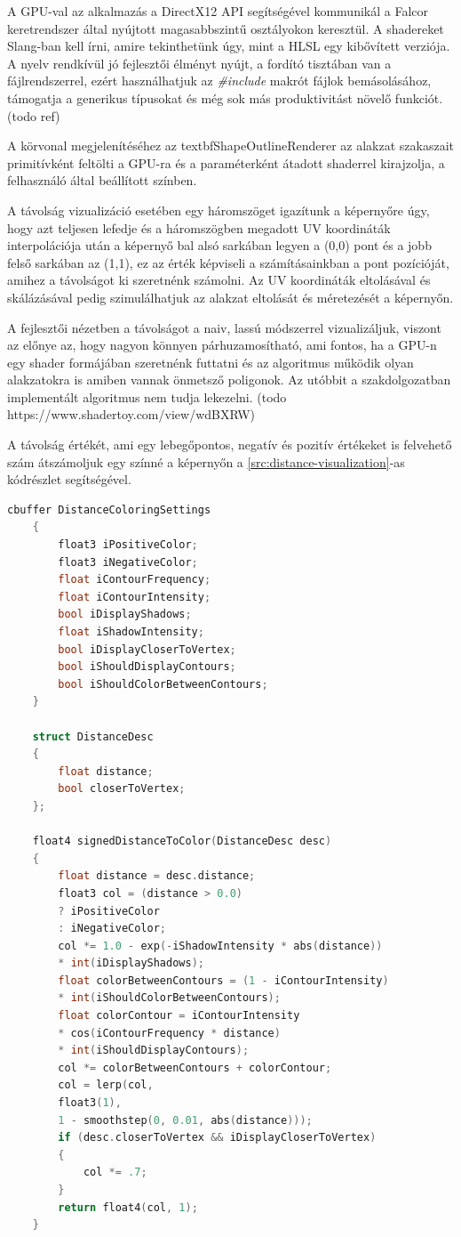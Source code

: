 A GPU-val az alkalmazás a DirectX12 API segítségével kommunikál a Falcor keretrendszer által nyújtott magasabbszintű osztályokon keresztül. A shadereket Slang-ban kell írni, amire tekinthetünk úgy, mint a HLSL egy kibővített verziója. A nyelv rendkívül jó fejlesztői élményt nyújt, a fordító tisztában van a fájlrendszerrel, ezért használhatjuk az \textit{\#include} makrót fájlok bemásolásához, támogatja a generikus típusokat és még sok más produktivitást növelő funkciót. (todo ref)

A körvonal megjelenítéséhez az textbf{ShapeOutlineRenderer} az alakzat szakaszait primitívként feltölti a GPU-ra és a paraméterként átadott shaderrel kirajzolja, a felhasználó által beállított színben.

A távolság vizualizáció esetében egy háromszöget igazítunk a képernyőre úgy, hogy azt teljesen lefedje és a háromszögben megadott UV koordináták interpolációja után a képernyő bal alsó sarkában legyen a (0,0) pont és a jobb felső sarkában az (1,1), ez az érték képviseli a számításainkban a pont pozícióját, amihez a távolságot ki szeretnénk számolni. Az UV koordináták eltolásával és skálázásával pedig szimulálhatjuk az alakzat eltolását és méretezését a képernyőn.

A fejlesztői nézetben a távolságot a naiv, lassú módszerrel vizualizáljuk, viszont az előnye az, hogy nagyon könnyen párhuzamosítható, ami fontos, ha a GPU-n egy shader formájában szeretnénk futtatni és az algoritmus működik olyan alakzatokra is amiben vannak önmetsző poligonok. Az utóbbit a szakdolgozatban implementált algoritmus nem tudja lekezelni. (todo https://www.shadertoy.com/view/wdBXRW)

A távolság értékét, ami egy lebegőpontos, negatív és pozitív értékeket is felvehető szám átszámoljuk egy színné a képernyőn a \ref{src:distance-visualization}-as kódrészlet segítségével.

\begin{lstlisting}[language=c]
	cbuffer DistanceColoringSettings
	{
		float3 iPositiveColor;
		float3 iNegativeColor;
		float iContourFrequency;
		float iContourIntensity;
		bool iDisplayShadows;
		float iShadowIntensity;
		bool iDisplayCloserToVertex;
		bool iShouldDisplayContours;
		bool iShouldColorBetweenContours;
	}

	struct DistanceDesc
	{
		float distance;
		bool closerToVertex;
	};

	float4 signedDistanceToColor(DistanceDesc desc)
	{
		float distance = desc.distance;
		float3 col = (distance > 0.0)
		? iPositiveColor
		: iNegativeColor;
		col *= 1.0 - exp(-iShadowIntensity * abs(distance))
		* int(iDisplayShadows);
		float colorBetweenContours = (1 - iContourIntensity)
		* int(iShouldColorBetweenContours);
		float colorContour = iContourIntensity
		* cos(iContourFrequency * distance)
		* int(iShouldDisplayContours);
		col *= colorBetweenContours + colorContour;
		col = lerp(col,
		float3(1),
		1 - smoothstep(0, 0.01, abs(distance)));
		if (desc.closerToVertex && iDisplayCloserToVertex)
		{
			col *= .7;
		}
		return float4(col, 1);
	}

\end{lstlisting}

